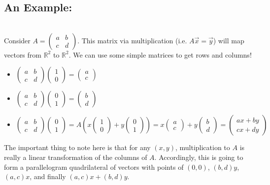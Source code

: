 \documentclass[12pt]{amsart}
\begin{document}
\subsection*{An Example:}\hfill\\
Consider $A=\begin{pmatrix}a&b\\c&d\end{pmatrix}$. This matrix via multiplication (i.e. $A\vec{x}=\vec{y}$) will map vectors from $\mathbb{R}^2$ to $\mathbb{R}^2$. We can use some simple matrices to get rows and columns!
\begin{itemize}
	\item $\begin{pmatrix}a&b\\c&d\end{pmatrix}\begin{pmatrix}1\\0\end{pmatrix}=\begin{pmatrix}a\\c\end{pmatrix}$
	\item $\begin{pmatrix}a&b\\c&d\end{pmatrix}\begin{pmatrix}0\\1\end{pmatrix}=\begin{pmatrix}b\\d\end{pmatrix}$
	\item $\begin{pmatrix}a&b\\c&d\end{pmatrix}\begin{pmatrix}0\\1\end{pmatrix}= A(x\begin{pmatrix}1\\0\end{pmatrix} + y\begin{pmatrix}0\\1\end{pmatrix}) = x\begin{pmatrix}a\\c\end{pmatrix} + y\begin{pmatrix}b\\d\end{pmatrix}=\begin{pmatrix}ax+by\\cx+dy\end{pmatrix}$
\end{itemize}
The important thing to note here is that for any $(x, y)$, multiplication to $A$ is really a linear transformation of the columns of $A$. Accordingly, this is going to form a parallelogram quadrilateral of vectors with points of $(0,0)$, $(b,d)y$, $(a,c)x$, and finally $(a,c)x + (b,d)y$.\\
\end{document}
